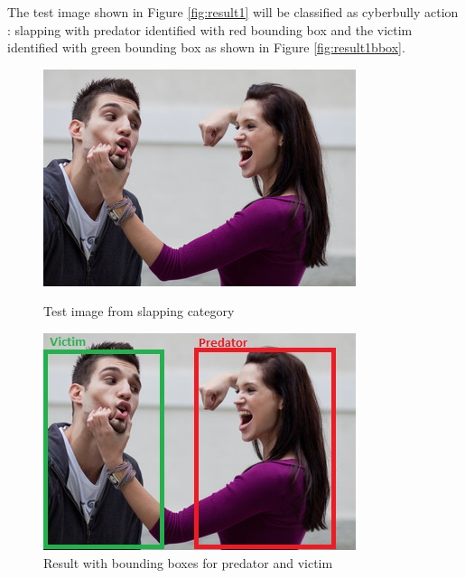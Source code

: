 \documentclass[12pt]{article}
\begin{document}
The test image shown in Figure \ref{fig:result1} will be classified as cyberbully action : slapping with predator identified with red bounding box and the victim identified with green bounding box as shown in Figure \ref{fig:result1bbox}.

\begin{figure}[H]
  \centering
  \begin{minipage}[b]{0.4\textwidth}
    \includegraphics[width=\textwidth]{./Images/Result2.jpeg}
    \caption{Test image from slapping category }
    \label{fig:result2}
  \end{minipage}
  \hfill
  \begin{minipage}[b]{0.4\textwidth}
    \includegraphics[width=\textwidth]{./Images/Result2_Bbox.jpeg}
    \caption{Result with bounding boxes for predator and victim}
    \label{fig:result2bbox}
  \end{minipage}
\end{figure}
\end{document}
